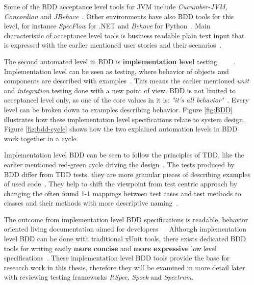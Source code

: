     Some of the BDD acceptance level tools for JVM include \textit{Cucumber-JVM, Concordion} and \textit{JBehave}~\cite{okolnychyi2016study}. Other
    environments have also BDD tools for this level, for instance \textit{SpecFlow} for .NET and \textit{Behave} for Python~\cite{smart2014bdd}.
    Main characteristic of acceptance level tools is business readable plain text input that is expressed with the earlier mentioned
    user stories and their scenarios~\cite{okolnychyi2016study}.

    The second automated level in BDD is \textbf{implementation level} testing ~\cite{chelimsky2010rspec}~\cite{solis2011study}~\cite{smart2014bdd}~\cite{okolnychyi2016study}.
    Implementation level can be seen as testing, where behavior of objects and components are described with examples~\cite{chelimsky2010rspec}.
    This means the earlier mentioned \textit{unit} and \textit{integration} testing done with a new point of view. BDD is not limited to acceptancel level
    only, as one of the core values in it is:
    \textit{"it's all behavior"}~\cite{chelimsky2010rspec}. Every level can be broken down to examples describing behavior.
    Figure \ref{fig:BDD} illustrates how these implementation level specifications relate to system design. Figure \ref{fig:bdd-cycle}
    shows how the two explained automation levels in BDD work together in a cycle.

    Implementation level BDD can be seen to follow the principles of TDD, like the earlier mentioned red-green cycle driving
    the design~\cite{smart2014bdd}. The tests produced by BDD differ from TDD tests, they are more granular pieces of
    describing examples of used code~\cite{astels2006new}. They help to shift the viewpoint from test centric approach by
    changing the often found 1-1 mappings between test cases and test methods to classes and their methods with more descriptive naming~\cite{astels2006new}.

    The outcome from implementation level BDD specifications is readable, behavior oriented living documentation aimed for developers~\cite{chelimsky2010rspec}~\cite{smart2014bdd}.
    Although implementation level BDD can be done with traditional xUnit tools,
    there exists dedicated BDD tools for writing easily \textbf{more concise} and \textbf{more expressive} low level specifications~\cite{smart2014bdd}.
    These implementation level BDD tools provide the base for research work
    in this thesis, therefore they will be examined in more detail later with reviewing testing frameworks \textit{RSpec, Spock} and
    \textit{Spectrum}.

